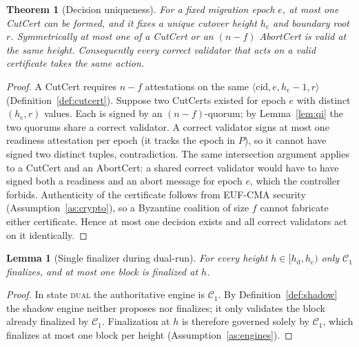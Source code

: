 \documentclass[journal]{IEEEtran}
\newtheorem{theorem}{Theorem}
\newtheorem{lemma}{Lemma}
\theoremstyle{remark}
\begin{document}
\begin{theorem}[Decision uniqueness]
\label{th:unique}
For a fixed migration epoch $e$, at most one CutCert can be formed, and it fixes a unique
cutover height $h_{\mathrm{c}}$ and boundary root $r$. Symmetrically at most one of a CutCert
or an $(n-f)$ AbortCert is valid at the same height. Consequently every correct validator that
acts on a valid certificate takes the same action.
\end{theorem}
\begin{proof}
A CutCert requires $n-f$ attestations on the same $\langle\mathrm{cid},e,h_{\mathrm{c}}-1,r\rangle$
(Definition~\ref{def:cutcert}). Suppose two CutCerts existed for epoch $e$ with distinct
$(h_{\mathrm{c}},r)$ values. Each is signed by an $(n-f)$-quorum; by Lemma~\ref{lem:qi} the two
quorums share a correct validator. A correct validator signs at most one readiness attestation
per epoch (it tracks the epoch in $P$), so it cannot have signed two distinct tuples,
contradiction. The same intersection argument applies to a CutCert and an AbortCert: a shared
correct validator would have to have signed both a readiness and an abort message for epoch
$e$, which the controller forbids. Authenticity of the certificate follows from EUF-CMA
security (Assumption~\ref{as:crypto}), so a Byzantine coalition of size $f$ cannot fabricate
either certificate. Hence at most one decision exists and all correct validators act on it
identically.
\end{proof}

\begin{lemma}[Single finalizer during dual-run]
\label{lem:single}
For every height $h\in[h_{\mathrm{d}},h_{\mathrm{c}})$ only $\mathcal{C}_1$ finalizes, and at
most one block is finalized at $h$.
\end{lemma}
\begin{proof}
In state \textsc{dual} the authoritative engine is $\mathcal{C}_1$. By
Definition~\ref{def:shadow} the shadow engine neither proposes nor finalizes; it only validates
the block already finalized by $\mathcal{C}_1$. Finalization at $h$ is therefore governed solely
by $\mathcal{C}_1$, which finalizes at most one block per height (Assumption~\ref{as:engines}).
\end{proof}
\end{document}
